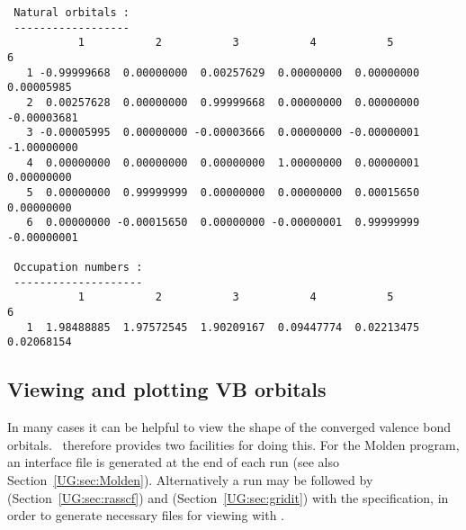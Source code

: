 {\begin{footnotesize}
\begin{verbatim}
 Natural orbitals :
 ------------------
           1           2           3           4           5           6
   1 -0.99999668  0.00000000  0.00257629  0.00000000  0.00000000  0.00005985
   2  0.00257628  0.00000000  0.99999668  0.00000000  0.00000000 -0.00003681
   3 -0.00005995  0.00000000 -0.00003666  0.00000000 -0.00000001 -1.00000000
   4  0.00000000  0.00000000  0.00000000  1.00000000  0.00000001  0.00000000
   5  0.00000000  0.99999999  0.00000000  0.00000000  0.00015650  0.00000000
   6  0.00000000 -0.00015650  0.00000000 -0.00000001  0.99999999 -0.00000001

 Occupation numbers :
 --------------------
           1           2           3           4           5           6
   1  1.98488885  1.97572545  1.90209167  0.09447774  0.02213475  0.02068154
\end{verbatim}
\end{footnotesize}}

\subsection{Viewing and plotting VB orbitals}
In many cases it can be helpful to view the shape of the converged valence bond 
orbitals. \molcas\ therefore provides two facilities for doing this. For the 
Molden program, an interface file is generated at the end of each 
 run (see also Section~\ref{UG:sec:Molden}). Alternatively a 
 run may be followed by  
(Section~\ref{UG:sec:rasscf}) and  
(Section~\ref{UG:sec:gridit}) with the  specification, in order to 
generate necessary files for viewing with .

